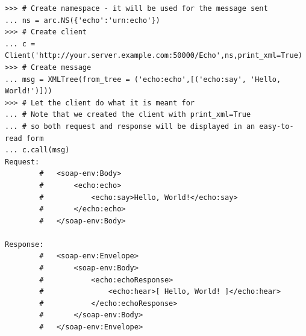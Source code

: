 \documentclass{article}
\begin{document}
\begin{flushleft}
\begin{itemize}
{\begin{example}
\begin{verbatim}
>>> # Create namespace - it will be used for the message sent
... ns = arc.NS({'echo':'urn:echo'})
>>> # Create client
... c = Client('http://your.server.example.com:50000/Echo',ns,print_xml=True)
>>> # Create message
... msg = XMLTree(from_tree = ('echo:echo',[('echo:say', 'Hello, World!')]))
>>> # Let the client do what it is meant for
... # Note that we created the client with print_xml=True
... # so both request and response will be displayed in an easy-to-read form
... c.call(msg)
Request:
        #   <soap-env:Body>
        #       <echo:echo>
        #           <echo:say>Hello, World!</echo:say>
        #       </echo:echo>
        #   </soap-env:Body>

Response:
        #   <soap-env:Envelope>
        #       <soap-env:Body>
        #           <echo:echoResponse>
        #               <echo:hear>[ Hello, World! ]</echo:hear>
        #           </echo:echoResponse>
        #       </soap-env:Body>
        #   </soap-env:Envelope>


\end{verbatim}
\end{example}}
\end{itemize}
\end{flushleft}
\end{document}
